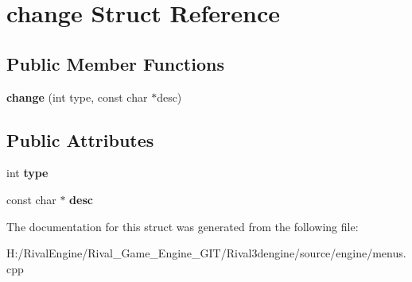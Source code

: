 \hypertarget{structchange}{}\section{change Struct Reference}
\label{structchange}
\subsection*{Public Member Functions}
\begin{DoxyCompactItemize}
\item 
\mbox{\label{structchange_a96f4faa94a7070116d0c1ce368327d0e}} 
{\bfseries change} (int type, const char $\ast$desc)
\end{DoxyCompactItemize}
\subsection*{Public Attributes}
\begin{DoxyCompactItemize}
\item 
\mbox{\label{structchange_a48a97423d8fcf6f24d85aa2199a74629}} 
int {\bfseries type}
\item 
\mbox{\label{structchange_a6c9368ca617819c702952087199163c3}} 
const char $\ast$ {\bfseries desc}
\end{DoxyCompactItemize}


The documentation for this struct was generated from the following file\+:\begin{DoxyCompactItemize}
\item 
H\+:/\+Rival\+Engine/\+Rival\+\_\+\+Game\+\_\+\+Engine\+\_\+\+G\+I\+T/\+Rival3dengine/source/engine/menus.\+cpp\end{DoxyCompactItemize}
